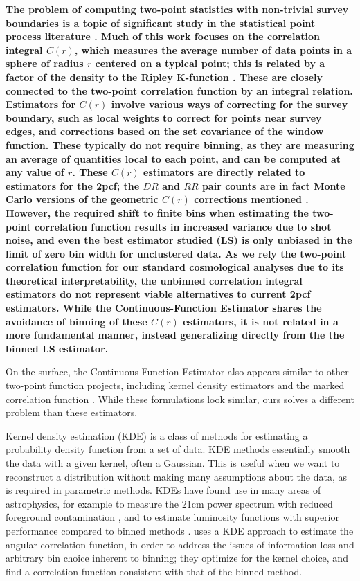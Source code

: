 \documentclass[modern]{aastex62}
\newcommand{\cf}{2pcf\xspace}
\newcommand{\est}{the Continuous-Function Estimator\xspace}
\newcommand{\LS}{LS\xspace}
\newcommand{\new}[1]{\textbf{#1}}
\begin{document}
\new{The problem of computing two-point statistics with non-trivial survey boundaries is a topic of significant study in the statistical point process literature \citep{Ripley1981, Illian2008, Diggle2013}.
Much of this work focuses on the correlation integral $C(r)$, which measures the average number of data points in a sphere of radius $r$ centered on a typical point; this is related by a factor of the density to the Ripley K-function \citep{Ripley1976}. These are closely connected to the two-point correlation function by an integral relation.
Estimators for $C(r)$ involve various ways of correcting for the survey boundary, such as local weights to correct for points near survey edges, and corrections based on the set covariance of the window function.
These typically do not require binning, as they are measuring an average of quantities local to each point, and can be computed at any value of $r$.
These $C(r)$ estimators are directly related to estimators for the \cf; the $DR$ and $RR$ pair counts are in fact Monte Carlo versions of the geometric $C(r)$ corrections mentioned \citep{Kerscher1999}.
However, the required shift to finite bins when estimating the two-point correlation function results in increased variance due to shot noise, and even the best estimator studied (\LS) is only unbiased in the limit of zero bin width for unclustered data.
As we rely the two-point correlation function for our standard cosmological analyses due to its theoretical interpretability, the unbinned correlation integral estimators do not represent viable alternatives to current \cf estimators.
While \est shares the avoidance of binning of these $C(r)$ estimators, it is not related in a more fundamental manner, instead generalizing directly from the the binned \LS estimator.}

On the surface, \est also appears similar to other two-point function projects, including kernel density estimators \citep {Hatfield2016} and the marked correlation function \citep{Beisbart2000}.
While these formulations look similar, ours solves a different problem than these estimators.

Kernel density estimation (KDE) is a class of methods for estimating a probability density function from a set of data.
KDE methods essentially smooth the data with a given kernel, often a Gaussian.
This is useful when we want to reconstruct a distribution without making many assumptions about the data, as is required in parametric methods.
KDEs have found use in many areas of astrophysics, for example to measure the 21cm power spectrum with reduced foreground contamination \citep{Trott2019}, and to estimate luminosity functions with superior performance compared to binned methods \citep{Yuan2020}.
\cite{Hatfield2016} uses a KDE approach to estimate the angular correlation function, in order to address the issues of information loss and arbitrary bin choice inherent to binning; they optimize for the kernel choice, and find a correlation function consistent with that of the binned method.
\end{document}
